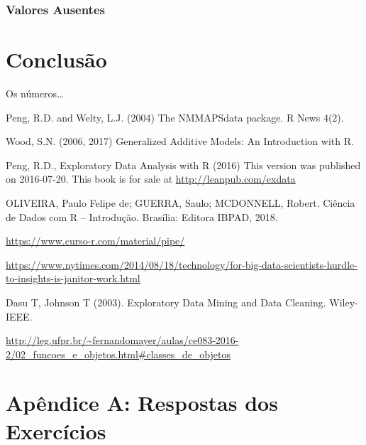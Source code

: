 \documentclass[]{book}
\begin{document}
\hypertarget{valores-ausentes}{%
\subsection{Valores Ausentes}\label{valores-ausentes}}

\hypertarget{summary}{%
\chapter{Conclusão}\label{summary}}

Os números\ldots{}

Peng, R.D. and Welty, L.J. (2004) The NMMAPSdata package. R News 4(2).

Wood, S.N. (2006, 2017) Generalized Additive Models: An Introduction with R.

Peng, R.D., Exploratory Data Analysis with R (2016) This version was published on 2016-07-20. This book is for sale at \url{http://leanpub.com/exdata}

OLIVEIRA, Paulo Felipe de; GUERRA, Saulo; MCDONNELL, Robert. Ciência de Dados com R -- Introdução. Brasília: Editora IBPAD, 2018.

\url{https://www.curso-r.com/material/pipe/}

\url{https://www.nytimes.com/2014/08/18/technology/for-big-data-scientists-hurdle-to-insights-is-janitor-work.html}

Dasu T, Johnson T (2003). Exploratory Data Mining and Data Cleaning. Wiley-IEEE.

\url{http://leg.ufpr.br/~fernandomayer/aulas/ce083-2016-2/02_funcoes_e_objetos.html\#classes_de_objetos}

\hypertarget{apuxeandice-a-respostas-dos-exercuxedcios}{%
\chapter*{Apêndice A: Respostas dos Exercícios}\label{apuxeandice-a-respostas-dos-exercuxedcios}}


\end{document}
